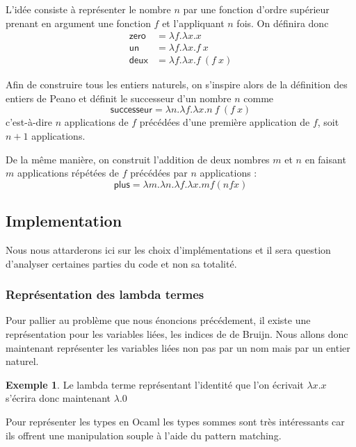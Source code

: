 \documentclass {article}
\theoremstyle{definition}
\newtheorem{example}{Exemple}
\theoremstyle{remark}
\begin{document}
L'idée consiste à représenter le nombre \(n\) par une fonction d'ordre
supérieur prenant en argument une fonction \(f\) et l'appliquant \(n\)
fois. On définira donc 
%
\begin{align*}
\mathsf{zero} &= \lambda f. \lambda x. x \\
\mathsf{un}   &= \lambda f. \lambda x. f\: x \\
\mathsf{deux} &= \lambda f. \lambda x. f\: (f\: x)
\end{align*}

Afin de construire tous les entiers naturels, on s'inspire alors de la
définition des entiers de Peano et définit le successeur d'un nombre \(n\)
comme
%
\[
\mathsf{successeur} = \lambda n. \lambda f. \lambda x. n\: f\: (f\: x)
\]
%
c'est-à-dire \(n\) applications de \(f\) précédées d'une première
application de \(f\), soit \(n+1\) applications.

De la même manière, on construit l'addition de deux nombres \(m\) et
\(n\) en faisant \(m\) applications répétées de \(f\) précédées par
\(n\) applications :
%
\[
\mathsf{plus} = \lambda m. \lambda n. \lambda f. \lambda x. m f (n f x)
\]


\subsection{Implementation}

Nous nous attarderons ici sur les choix d'implémentations et il sera question
d'analyser certaines parties du code et non sa totalité.

\subsubsection{Représentation des lambda termes}
 
Pour pallier au problème que nous énoncions précédement, il existe une 
représentation pour les variables liées, les indices de de Bruijn.
Nous allons donc maintenant représenter les variables liées non pas par un 
nom mais par un entier naturel. 

\begin{example}
  Le lambda terme représentant l'identité que l'on écrivait \(\lambda x.x\) s'écrira donc maintenant \(\lambda.0\)
\end{example}
Pour représenter les types en Ocaml les types sommes sont très intéressants car 
ils offrent une manipulation souple à l'aide du pattern matching.
\end{document}
